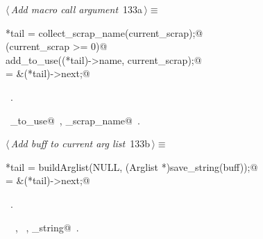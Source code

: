 \documentclass[a4paper]{report}
\begin{document}
\begin{flushleft} \small
\begin{minipage}{\linewidth}\label{scrap284}\raggedright\small
{} $\langle\,${\it Add macro call argument}\nobreak\ {\footnotesize {133a}}$\,\rangle\equiv$
\vspace{-1ex}
\begin{list}{}{} \item
\mbox{}\verb@*tail = collect_scrap_name(current_scrap);@\\
\mbox{}\verb@if (current_scrap >= 0)@\\
\mbox{}\verb@  add_to_use((*tail)->name, current_scrap);@\\
\mbox{}\verb@tail = &(*tail)->next;@\\
\mbox{}\verb@@{\NWsep}
\end{list}
\vspace{-1.5ex}
\footnotesize
\begin{list}{}{\setlength{\itemsep}{-\parsep}\setlength{\itemindent}{-\leftmargin}}
\item \NWtxtMacroRefIn\ .
\item \NWtxtIdentsUsed\nobreak\  \verb@add_to_use@\nobreak\ , \verb@collect_scrap_name@\nobreak\ .
\item{}
\end{list}
\end{minipage}\vspace{4ex}
\end{flushleft}
\begin{flushleft} \small
\begin{minipage}{\linewidth}\label{scrap285}\raggedright\small
{} $\langle\,${\it Add buff to current arg list}\nobreak\ {\footnotesize {133b}}$\,\rangle\equiv$
\vspace{-1ex}
\begin{list}{}{} \item
\mbox{}\verb@*tail = buildArglist(NULL, (Arglist *)save_string(buff));@\\
\mbox{}\verb@tail = &(*tail)->next;@\\
\mbox{}\verb@@{\NWsep}
\end{list}
\vspace{-1.5ex}
\footnotesize
\begin{list}{}{\setlength{\itemsep}{-\parsep}\setlength{\itemindent}{-\leftmargin}}
\item \NWtxtMacroRefIn\ .
\item \NWtxtIdentsUsed\nobreak\  \verb@Arglist@\nobreak\ , \verb@buildArglist@\nobreak\ , \verb@save_string@\nobreak\ .
\item{}
\end{list}
\end{minipage}\vspace{4ex}
\end{flushleft}
\end{document}
